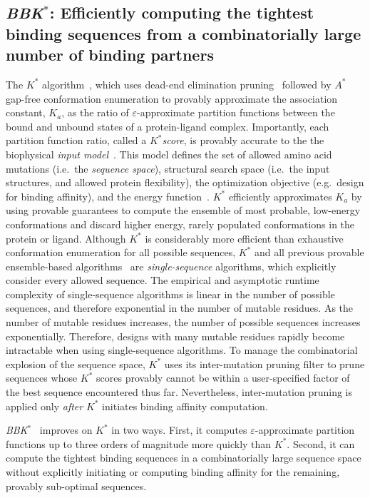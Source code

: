 \def\as{\textit{$A^*$}\xspace}
\def\ks{\textit{$K^*$}\xspace}
\def\ka{\textit{$K_a$}\xspace}
\def\bbks{\textit{BBK$^*$}\xspace}

\subsection{\bbks: Efficiently computing the tightest binding sequences from a combinatorially large number of binding partners}

The \ks algorithm~\cite{}, which uses dead-end elimination pruning~\cite{} followed by \as~\cite{} gap-free conformation enumeration to provably approximate the association constant, \ka, as the ratio of $\varepsilon$-approximate partition functions between the bound and unbound states of a protein-ligand complex. Importantly, each partition function ratio, called a \ks \emph{score}, is provably accurate to the the biophysical \emph{input model}~\cite{}. This model defines the set of allowed amino acid mutations (i.e.~the \emph{sequence space}), structural search space (i.e.~the input structures, and allowed protein flexibility), the optimization objective (e.g.~design for binding affinity), and the energy function~\cite{}. \ks efficiently approximates \ka by using provable guarantees to compute the ensemble of most probable, low-energy conformations and discard higher energy, rarely populated conformations in the protein or ligand. Although \ks is considerably more efficient than exhaustive conformation enumeration for all possible sequences, \ks and all previous provable ensemble-based algorithms~\cite{} are \emph{single-sequence} algorithms, which explicitly consider every allowed sequence. The empirical and asymptotic runtime complexity of single-sequence algorithms is linear in the number of possible sequences, and therefore exponential in the number of mutable residues. As the number of mutable residues increases, the number of possible sequences increases exponentially. Therefore, designs with many mutable residues rapidly become intractable when using single-sequence algorithms. To manage the combinatorial explosion of the sequence space, \ks uses its inter-mutation pruning filter to prune sequences whose \ks scores provably cannot be within a user-specified factor of the best sequence encountered thus far. Nevertheless, inter-mutation pruning is applied only \emph{after} \ks initiates binding affinity computation.

\bbks~\cite{BBK*} improves on \ks in two ways. First, it computes $\varepsilon$-approximate partition functions up to three orders of magnitude more quickly than \ks.
Second, it can compute the tightest binding sequences in a combinatorially large sequence space without explicitly initiating or computing binding affinity for the remaining, provably sub-optimal sequences.